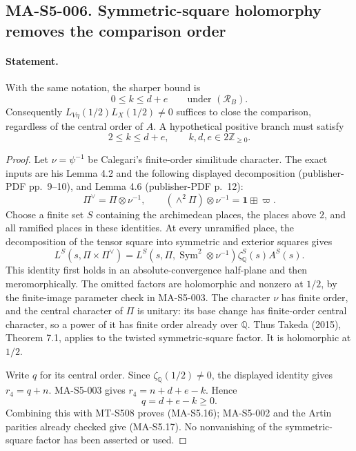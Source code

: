 \subsection*{MA-S5-006. Symmetric-square holomorphy removes the comparison order}

\paragraph{Statement.}
With the same notation, the sharper bound is
\[
                 0\le k\le d+e
       \qquad\text{under }(\mathcal R_B).
 \tag{MA-S5.16}
\]
Consequently $L_{V\eta}(1/2)L_X(1/2)\ne0$ suffices to close the
comparison, regardless of the central order of $A$. A hypothetical
positive branch must satisfy
\[
       2\le k\le d+e,\qquad k,d,e\in2\mathbb Z_{\ge0}.
 \tag{MA-S5.17}
\]

\begin{proof}
Let $\nu=\psi^{-1}$ be Calegari's finite-order similitude character.
The exact inputs are his Lemma 4.2 and the following displayed
decomposition (publisher-PDF pp.~9--10), and Lemma 4.6
(publisher-PDF p.~12):
\[
 \Pi^\vee=\Pi\otimes\nu^{-1},\qquad
       (\wedge^2\Pi)\otimes\nu^{-1}=\mathbf1\boxplus\varpi.
\]
Choose a finite set $S$ containing the archimedean places, the
places above $2$, and all ramified places in these identities.
At every unramified place, the decomposition of the tensor square
into symmetric and exterior squares gives
\[
 L^S(s,\Pi\times\Pi^\vee)
  =L^S(s,\Pi,\operatorname{Sym}^2\otimes\nu^{-1})
       \zeta_{\mathbb Q}^S(s)A^S(s).
\]
This identity first holds in an absolute-convergence half-plane
and then meromorphically. The omitted factors are holomorphic
and nonzero at $1/2$, by the finite-image parameter check in
MA-S5-003. The character $\nu$ has finite order, and the central
character of $\Pi$ is unitary: its base change has finite-order
central character, so a power of it has finite order already
over $\mathbb Q$. Thus Takeda (2015), Theorem 7.1, applies to
the twisted symmetric-square factor. It is holomorphic at $1/2$.

Write $q$ for its central order. Since $\zeta_{\mathbb Q}(1/2)\ne0$,
the displayed identity gives $r_4=q+n$. MA-S5-003 gives
$r_4=n+d+e-k$. Hence
\[
                         q=d+e-k\ge0.
\]
Combining this with MT-S508 proves (MA-S5.16); MA-S5-002 and the
Artin parities already checked give (MA-S5.17). No nonvanishing
of the symmetric-square factor has been asserted or used.
\end{proof}

